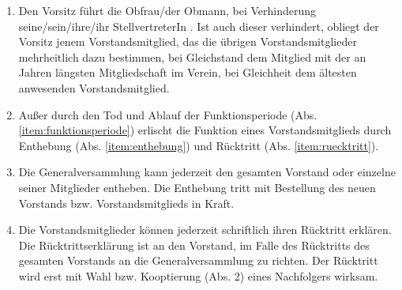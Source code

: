 \documentclass[a4paper,12pt]{article}
\newcommand{\comment}[1]{{\bf /*Komm.:} \textit{#1} {\bf */}}
\def\comment#1{}
\newcommand{\stv}{StellvertreterIn }
\begin{document}
\begin{enumerate}
\item Den Vorsitz führt die Obfrau/der Obmann, bei Verhinderung seine/sein/ihre/ihr \stv.
Ist auch dieser verhindert, obliegt der Vorsitz
jenem Vorstandsmitglied, das die übrigen Vorstandsmitglieder mehrheitlich dazu bestimmen, bei Gleichstand
dem Mitglied mit der an Jahren längsten Mitgliedschaft im Verein, bei Gleichheit dem ältesten anwesenden Vorstandsmitglied. \comment{Synthese aus bisherigen Varianten: als erstes zählt Wahl, dann länge Mitgliedschaft, dann Alter}

\item Außer durch den Tod und Ablauf der Funktionsperiode (Abs. \ref{item:funktionsperiode}) erlischt die Funktion eines Vorstandsmitglieds durch Enthebung (Abs. \ref{item:enthebung}) und Rücktritt (Abs. \ref{item:ruecktritt}).
\item \label{item:enthebung} Die Generalversammlung kann jederzeit den gesamten Vorstand oder einzelne seiner Mitglieder entheben. Die Enthebung tritt mit Bestellung des neuen Vorstands bzw. Vorstandsmitglieds in Kraft.
\item \label{item:ruecktritt} Die Vorstandsmitglieder können jederzeit schriftlich ihren Rücktritt erklären. Die Rücktrittserklärung ist an den Vorstand, im Falle des Rücktritts des gesamten Vorstands an die Generalversammlung zu richten. Der Rücktritt wird erst mit Wahl bzw. Kooptierung (Abs. 2) eines Nachfolgers wirksam.
\end{enumerate}
\end{document}
